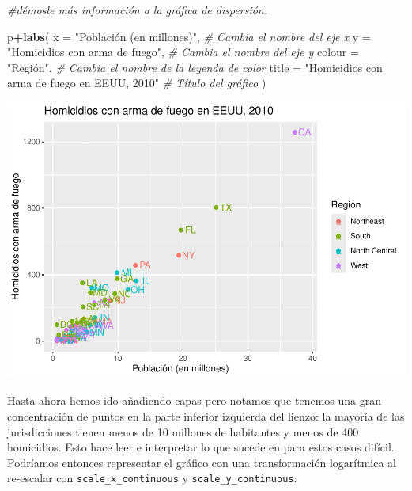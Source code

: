 \documentclass[
]{article}
\newenvironment{Shaded}{\begin{snugshade}}{\end{snugshade}}
\newcommand{\AttributeTok}[1]{\textcolor[rgb]{0.13,0.29,0.53}{#1}}
\newcommand{\CommentTok}[1]{\textcolor[rgb]{0.56,0.35,0.01}{\textit{#1}}}
\newcommand{\FunctionTok}[1]{\textcolor[rgb]{0.13,0.29,0.53}{\textbf{#1}}}
\newcommand{\NormalTok}[1]{#1}
\newcommand{\SpecialCharTok}[1]{\textcolor[rgb]{0.81,0.36,0.00}{\textbf{#1}}}
\newcommand{\StringTok}[1]{\textcolor[rgb]{0.31,0.60,0.02}{#1}}
\begin{document}
\begin{Shaded}
\begin{Highlighting}[]
\CommentTok{\#démosle más información a la gráfica de dispersión.}

\NormalTok{p}\SpecialCharTok{+}\FunctionTok{labs}\NormalTok{(}
  \AttributeTok{x =} \StringTok{"Población (en millones)"}\NormalTok{,   }\CommentTok{\# Cambia el nombre del eje x}
  \AttributeTok{y =} \StringTok{"Homicidios con arma de fuego"}\NormalTok{,            }\CommentTok{\# Cambia el nombre del eje y}
  \AttributeTok{colour =} \StringTok{"Región"}\NormalTok{,              }\CommentTok{\# Cambia el nombre de la leyenda de color}
  \AttributeTok{title =} \StringTok{"Homicidios con arma de fuego en EEUU, 2010"}  \CommentTok{\# Título del gráfico}
\NormalTok{)}
\end{Highlighting}
\end{Shaded}

\includegraphics{Taller-2_files/figure-latex/Añadiendo títulos-1.pdf}

Hasta ahora hemos ido añadiendo capas pero notamos que tenemos una gran
concentración de puntos en la parte inferior izquierda del lienzo: la
mayoría de las jurisdicciones tienen menos de 10 millones de habitantes
y menos de 400 homicidios. Esto hace leer e interpretar lo que sucede en
para estos casos difícil. Podríamos entonces representar el gráfico con
una transformación logarítmica al re-escalar con
\texttt{scale\_x\_continuous} y \texttt{scale\_y\_continuous}:
\end{document}
